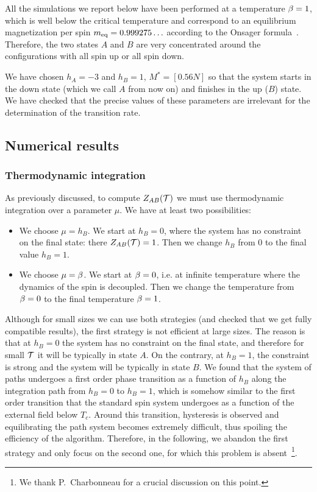\documentclass[aps,twocolumn,floats,pre,amsmath,superscriptaddress]{revtex4}
\def\TT{{\cal T}}\def\NN{{\cal N}} \def\BB{{\cal B}}\def\II{{\cal I}}
\newcommand{\<}{\langle}
\renewcommand{\>}{\rangle}
\begin{document}
All the simulations we report below have been performed at a temperature $\beta=1$, which
is well below the critical temperature and correspond to an equilibrium magnetization
per spin
$m_{\rm eq} = 0.999275\ldots$ according to the Onsager formula~\cite{onsager}. Therefore,
the two states $A$ and $B$ are very concentrated around the configurations with all
spin up or all spin down.

We have chosen $h_A=-3$ and $h_B=1$, $M^* = [0.56 N]$ so that the system starts in the down
state (which we call $A$ from now on) 
and finishes in the up ($B$) state. We have checked that the precise values of these parameters
are irrelevant for the determination of the transition rate.


\subsection{Numerical results}

\subsubsection{Thermodynamic integration}

As previously discussed, to compute $Z_{AB}(\TT)$ we must use thermodynamic integration
over a parameter $\mu$.
We have at least two possibilities:
\begin{itemize}
\item We choose $\mu = h_B$. We start at $h_B=0$, where the system has no constraint on
the final state: there $Z_{AB}(\TT)=1$. Then we change $h_B$ from $0$ to the final value
$h_B = 1$.
\item We choose $\mu = \beta$. We start at $\beta=0$, i.e. 
at infinite temperature where the dynamics of the spin is decoupled. Then we change the
temperature from $\beta=0$ to the final temperature $\beta=1$.
\end{itemize}
Although for small sizes we can use both strategies (and checked that
we get fully compatible results),
the first strategy is not efficient at large sizes. The reason is that at $h_B=0$ the 
system has no constraint on the final state, and therefore for small $\TT$ it will be
typically in state $A$. On the contrary, at $h_B=1$, the constraint is strong and the
system will be typically in state $B$. We found that the system of paths undergoes a first
order phase transition as a function of $h_B$ along the integration path from $h_B=0$ to
$h_B=1$, which is somehow similar to the first order transition that the standard spin system
undergoes as a function of the external field below $T_c$. Around this transition, hysteresis
is observed and equilibrating the path system becomes extremely difficult, thus spoiling the
efficiency of the algorithm. Therefore, in the following, we abandon the first strategy and
only focus on the second one, for which this problem is absent~\footnote{We thank 
P.~Charbonneau for a crucial discussion on this point.}.
\end{document}
